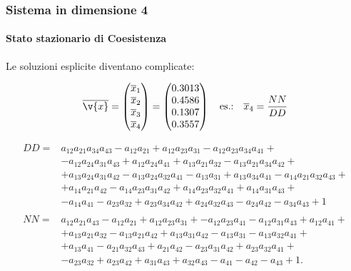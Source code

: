 \begin{frame}
\frametitle{Sistema in dimensione 4}
\framesubtitle{Stato stazionario di Coesistenza}
\begin{center}
Le soluzioni esplicite diventano complicate:
\end{center}
\[
    \overline{\v{x}} = \begin{pmatrix} \overline{x}_1 \\ 
                                       \overline{x}_2 \\ 
				       \overline{x}_3 \\ 
				       \overline{x}_4
		       \end{pmatrix} 
		       = \begin{pmatrix} 
			   0.3013 \\
			   0.4586 \\
			   0.1307 \\
			   0.3557
		       \end{pmatrix}
		       \quad  \text{es.:}  \quad \overline{x}_4 = \frac{NN}{DD}
\] 
\begin{tiny}
    \[\begin{aligned}
	DD =& a_{12} a_{21} a_{34} a_{43} - a_{12} a_{21} + 
	     a_{12} a_{23} a_{31} - a_{12} a_{23} a_{34} a_{41} + \\
	   & - a_{12} a_{24} a_{31} a_{43} + a_{12} a_{24} a_{41} +
	     a_{13} a_{21} a_{32} - a_{13} a_{21} a_{34} a_{42} + \\
	   & + a_{13} a_{24} a_{31} a_{42} - a_{13} a_{24} a_{32} a_{41}
	    - a_{13} a_{31} + a_{13} a_{34} a_{41} - a_{14} a_{21} a_{32} a_{43} +\\
	   & + a_{14} a_{21} a_{42} - a_{14} a_{23} a_{31} a_{42}  
	    + a_{14} a_{23} a_{32} a_{41} + a_{14} a_{31} a_{43} + \\
	   & - a_{14} a_{41} - a_{23} a_{32} + a_{23} a_{34} a_{42}
	    + a_{24} a_{32} a_{43} - a_{24} a_{42} - a_{34} a_{43} + 1\\
	   &\\
	NN =& a_{12} a_{21} a_{43} - a_{12} a_{21} + a_{12} a_{23} a_{31} + 
	      - a_{12} a_{23} a_{41} - a_{12} a_{31} a_{43} + a_{12} a_{41} + \\
	    & + a_{13} a_{21} a_{32} - a_{13} a_{21} a_{42} + a_{13} a_{31} a_{42} - a_{13} a_{31} - a_{13} a_{32} a_{41} + \\
	    & + a_{13} a_{41} - a_{21} a_{32} a_{43} + a_{21} a_{42} - a_{23} a_{31} a_{42} + a_{23} a_{32} a_{41} + \\
	    &  - a_{23} a_{32} + a_{23} a_{42} + a_{31} a_{43} + a_{32} a_{43} - a_{41} - a_{42} - a_{43} + 1
    .\end{aligned}\]
\end{tiny}
\end{frame}

